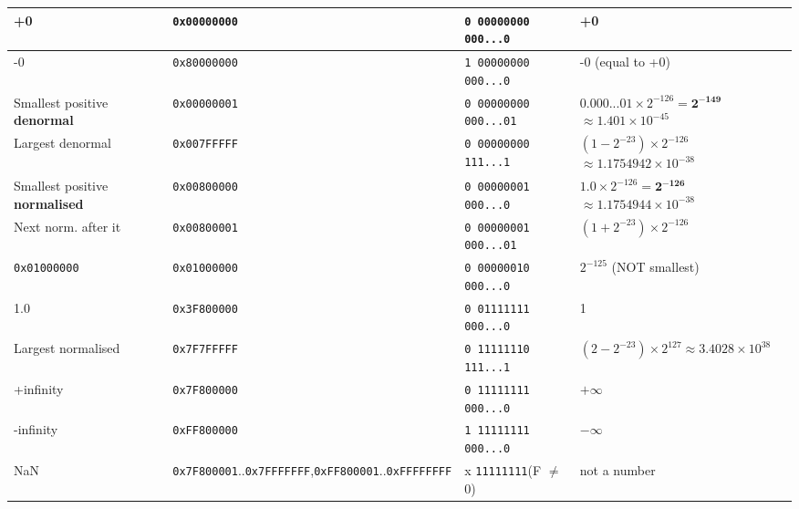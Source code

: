 \documentclass[10pt, portrait]{article}
\begin{document}
\begin{multicols*}{2}
\begin{center}
{\begin{tabular}{|p{1.8cm}|p{1.9cm}|p{2.1cm}|p{2.9cm}|}
    +0 & \texttt{0x00000000} & \texttt{0 00000000\newline 000...0} & +0 \\ \hline
    -0 & \texttt{0x80000000} & \texttt{1 00000000\newline 000...0} & -0 (equal to +0) \\ \hline
    Smallest positive \textbf{denormal} & \texttt{0x00000001} & \texttt{0 00000000\newline 000...01} & $0.000...01 \times 2^{-126}$\newline $= \mathbf{2^{-149}}$\newline $\approx 1.401 \times 10^{-45}$ \\ \hline
    Largest denormal & \texttt{0x007FFFFF} & \texttt{0 00000000\newline 111...1} & $(1 - 2^{-23}) \times 2^{-126}$\newline $\approx 1.1754942 \times 10^{-38}$ \\ \hline
    Smallest positive \textbf{normalised} & \texttt{0x00800000} & \texttt{0 00000001\newline 000...0} & $1.0 \times 2^{-126} = \mathbf{2^{-126}}$\newline $\approx 1.1754944 \times 10^{-38}$ \\ \hline
    Next norm. after it & \texttt{0x00800001} & \texttt{0 00000001\newline 000...01} & $(1 + 2^{-23}) \times 2^{-126}$ \\ \hline
    \texttt{0x01000000} & \texttt{0x01000000} & \texttt{0 00000010\newline 000...0} & $2^{-125}$ (NOT smallest) \\ \hline
    1.0 & \texttt{0x3F800000} & \texttt{0 01111111\newline 000...0} & 1 \\ \hline
    Largest normalised & \texttt{0x7F7FFFFF} & \texttt{0 11111110\newline 111...1} & $(2 - 2^{-23}) \times 2^{127}$\newline $\approx 3.4028 \times 10^{38}$ \\ \hline
    +infinity & \texttt{0x7F800000} & \texttt{0 11111111\newline 000...0} & $+\infty$ \\ \hline
    -infinity & \texttt{0xFF800000} & \texttt{1 11111111\newline 000...0} & $-\infty$ \\ \hline
    NaN & \texttt{0x7F800001}..\newline\texttt{0x7FFFFFFF},\newline \texttt{0xFF800001}..\newline\texttt{0xFFFFFFFF} & x \texttt{11111111}\newline (F $\neq$ 0) & not a number \\ \hline
    \end{tabular}%
    }
    \endgroup
\end{center}


\end{multicols*}
\end{document}
